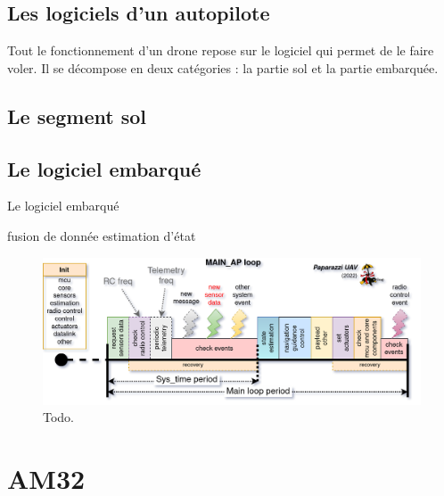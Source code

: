  \subsection{Les logiciels d'un autopilote}
 \label{sec:logiciel}
 Tout le fonctionnement d'un drone repose sur le logiciel qui permet de le faire voler. Il se décompose en deux catégories : la partie sol et la partie embarquée.

 \subsection{Le segment sol}
 \subsection{Le logiciel embarqué}
 Le logiciel embarqué 

 fusion de donnée 
 estimation d'état 

 \begin{figure}[ht!]
    \centerline{
    \includegraphics[trim=0cm 0cm 0cm 0cm,clip,width=1\columnwidth]{figures/PPRZ_Main_ap_loop.png}}
    \caption{Todo.}
    \label{fig:schedulingpaparazzi}
\end{figure}


\section{AM32}
\label{sec:AM32}